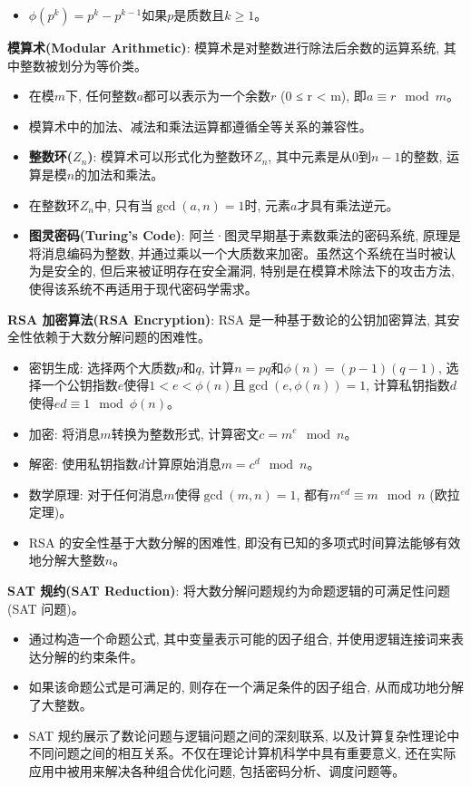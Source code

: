\documentclass[12pt, a4paper, UTF8]{ctexart}
\newcommand{\term}[1]{\textbf{\textcolor{blue!80!black}{#1}}}
\begin{document}
\begin{sloppypar}
\begin{itemize}[nosep]
        \item $\phi(p^k) = p^k - p^{k-1}$如果$p$是质数且$k \geq 1$。
    \end{itemize}
    \term{模算术(Modular Arithmetic)}: 模算术是对整数进行除法后余数的运算系统, 其中整数被划分为等价类。
    \begin{itemize}[nosep]
        \item 在模$m$下, 任何整数$a$都可以表示为一个余数$r$ (0 ≤ r < m), 即$a \equiv r \mod m$。
        \item 模算术中的加法、减法和乘法运算都遵循全等关系的兼容性。
        \item \term{整数环($Z_n$)}: 模算术可以形式化为整数环$Z_n$, 其中元素是从0到$n-1$的整数, 运算是模$n$的加法和乘法。
        \item 在整数环$Z_n$中, 只有当$\gcd(a, n) = 1$时, 元素$a$才具有乘法逆元。
        \item \term{图灵密码(Turing's Code)}: 阿兰·图灵早期基于素数乘法的密码系统, 原理是将消息编码为整数, 并通过乘以一个大质数来加密。虽然这个系统在当时被认为是安全的, 但后来被证明存在安全漏洞, 特别是在模算术除法下的攻击方法, 使得该系统不再适用于现代密码学需求。
    \end{itemize}
    \term{RSA 加密算法(RSA Encryption)}: RSA 是一种基于数论的公钥加密算法, 其安全性依赖于大数分解问题的困难性。
    \begin{itemize}[nosep]
        \item 密钥生成: 选择两个大质数$p$和$q$, 计算$n = pq$和$\phi(n) = (p-1)(q-1)$, 选择一个公钥指数$e$使得$1 < e < \phi(n)$且$\gcd(e, \phi(n)) = 1$, 计算私钥指数$d$使得$ed \equiv 1 \mod \phi(n)$。
        \item 加密: 将消息$m$转换为整数形式, 计算密文$c = m^e \mod n$。
        \item 解密: 使用私钥指数$d$计算原始消息$m = c^d \mod n$。
        \item 数学原理: 对于任何消息$m$使得$\gcd(m, n) = 1$, 都有$m^{ed} \equiv m \mod n$ (欧拉定理)。
        \item RSA 的安全性基于大数分解的困难性, 即没有已知的多项式时间算法能够有效地分解大整数$n$。
    \end{itemize}
    \term{SAT 规约(SAT Reduction)}: 将大数分解问题规约为命题逻辑的可满足性问题(SAT 问题)。
    \begin{itemize}[nosep]
        \item 通过构造一个命题公式, 其中变量表示可能的因子组合, 并使用逻辑连接词来表达分解的约束条件。
        \item 如果该命题公式是可满足的, 则存在一个满足条件的因子组合, 从而成功地分解了大整数。
        \item SAT 规约展示了数论问题与逻辑问题之间的深刻联系, 以及计算复杂性理论中不同问题之间的相互关系。不仅在理论计算机科学中具有重要意义, 还在实际应用中被用来解决各种组合优化问题, 包括密码分析、调度问题等。
    \end{itemize}
    \newpage


\end{sloppypar}
\end{document}
